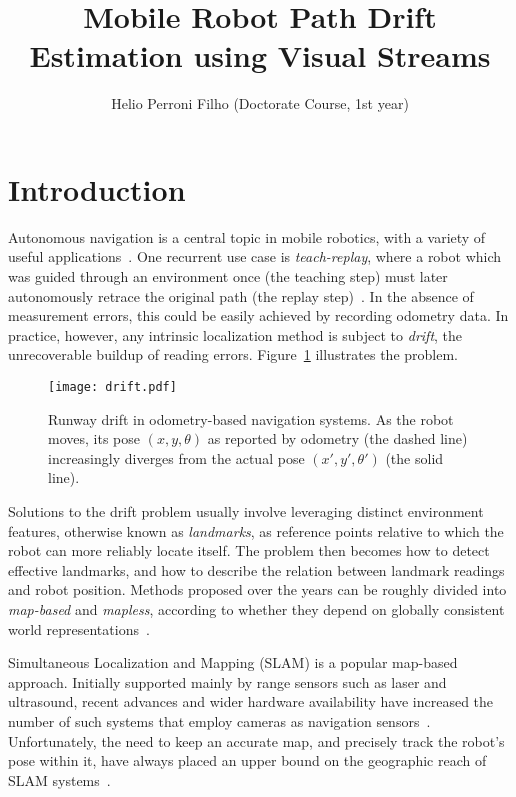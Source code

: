 \documentclass[twocolumn, 9pt,fleqn]{jsproceedings}
\title{Mobile Robot Path Drift Estimation using Visual Streams}
\author{Helio Perroni Filho (Doctorate Course, 1st year)\authorrefmark{1}}
\affiliation{Intelligent Robotics Laboratory, OHYA's group}
\begin{document}
\thispagestyle{myheadings}
\maketitle


\section{Introduction}

Autonomous navigation is a central topic in mobile robotics, with a variety of useful applications~\cite{BON02,ARK90}. One recurrent use case is \textit{teach-replay}, where a robot which was guided through an environment once (the teaching step) must later autonomously retrace the original path (the replay step)~\cite{BUR01}. In the absence of measurement errors, this could be easily achieved by recording odometry data. In practice, however, any intrinsic localization method is subject to \textit{drift}, the unrecoverable buildup of reading errors. Figure~\ref{fig:drift} illustrates the problem.

\begin{figure}[h!]
\vspace{20pt}
\texttt{[image: drift.pdf]}
\vspace{10pt}
\caption{Runway drift in odometry-based navigation systems. As the robot moves, its pose $(x, y, \theta)$ as reported by odometry (the dashed line) increasingly diverges from the actual pose $(x', y', \theta')$ (the solid line).}
\label{fig:drift}
\end{figure}

Solutions to the drift problem usually involve leveraging distinct environment features, otherwise known as \textit{landmarks}, as reference points relative to which the robot can more reliably locate itself. The problem then becomes how to detect effective landmarks, and how to describe the relation between landmark readings and robot position. Methods proposed over the years can be roughly divided into \textit{map-based} and \textit{mapless}, according to whether they depend on globally consistent world representations~\cite{BON02}.

Simultaneous Localization and Mapping (SLAM) is a popular map-based approach. Initially supported mainly by range sensors such as laser and ultrasound, recent advances and wider hardware availability have increased the number of such systems that employ cameras as navigation sensors~\cite{DAV07,CUM08}. Unfortunately, the need to keep an accurate map, and precisely track the robot's pose within it, have always placed an upper bound on the geographic reach of SLAM systems~\cite{CAS04}.
\end{document}
